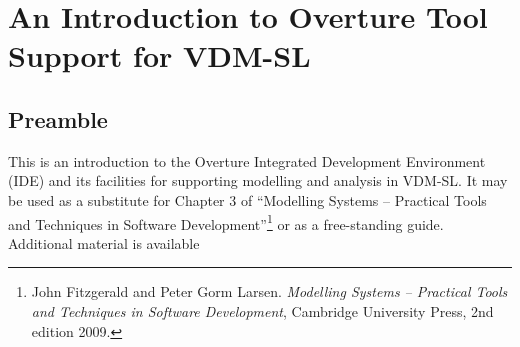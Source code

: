 \chapter{An Introduction to Overture Tool Support for VDM-SL}\label{cha:toolbox}
\initexercise

\section*{Preamble}

This is an introduction to the Overture Integrated Development
Environment (IDE) and its facilities for supporting modelling and
analysis in VDM-SL. It may be used as a substitute for Chapter 3 of
``Modelling Systems -- Practical Tools and Techniques in Software
Development''\footnote{John Fitzgerald and Peter Gorm
  Larsen. \emph{Modelling Systems -- Practical Tools and Techniques in
    Software Development}, Cambridge University Press, 2nd edition
  2009.} or as a free-standing guide. Additional material is available
